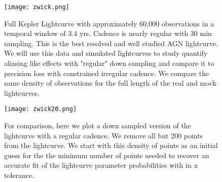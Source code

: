 \documentclass[]{article}
\begin{document}
        \begin{figure}
        	\texttt{[image: zwick.png]}
        	\caption{Full Kepler Lightcurve with approximately 60,000 observations in a temporal window of 3.4 yrs.  Cadence is nearly regular with 30 min sampling.  This is the best resolved and well studied AGN lightcurve.  We will use this data and simulated lightcurves to study quantify aliasing like effects with "regular" down sampling and compare it to precision loss with constrained irregular cadence.  We compare the same density of observations for the full length of the real and mock lightcurves.   }
        	\label{fig:example_figure}
        \end{figure}        
	     \begin{figure}
	     	\texttt{[image: zwick20.png]}
	     	\caption{For comparison, here we plot a down sampled version of the lightcurve with a regular cadence.  We remove all but 200 points from the lightcurve.  We start with this density of points as an initial guess for the the minimum number of points needed to recover an accurate fit of the lightcurve parameter probabilities with in x tolerance. }
	     	\label{fig:example_figure}
	     \end{figure}   
        
\end{document}
